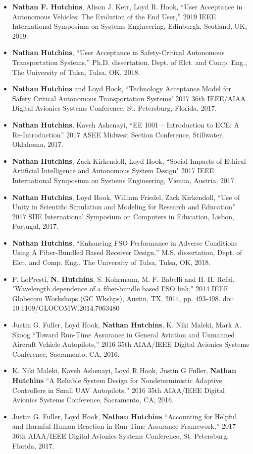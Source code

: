 \documentclass[line]{res} %
\begin{document}
\begin{resume}
\vspace{15pt} %
\begin{itemize} \itemsep -2pt %
\item \textbf{Nathan F. Hutchins}, Alison J. Kerr, Loyd R. Hook, ``User Acceptance in Autonomous Vehicles: The Evolution of the End User,'' 2019 IEEE International Symposium on Systems Engineering, Edinburgh, Scotland, UK, 2019.
\item \textbf{Nathan Hutchins}, ``User Acceptance in Safety-Critical Autonomous Transportation Systems,'' Ph.D. dissertation, Dept. of Elct. and Comp. Eng., The University of Tulsa, Tulsa, OK, 2018.
\item \textbf{Nathan Hutchins} and Loyd Hook, “Technology Acceptance Model for Safety Critical Autonomous Transportation Systems’ 2017 36th IEEE/AIAA Digital Avionics Systems
Conference, St. Petersburg, Florida, 2017.
\item \textbf{Nathan Hutchins}, Kaveh Ashenayi, “EE 1001 – Introduction to ECE: A Re-Introduction” 2017 ASEE Midwest Section Conference, Stillwater, Oklahoma, 2017.
\item \textbf{Nathan Hutchins}, Zack Kirkendoll, Loyd Hook, “Social Impacts of Ethical Artificial Intelligence and Autonomous System Design" 2017 IEEE International Symposium on Systems Engineering, Vienna, Austria, 2017.
\item \textbf{Nathan Hutchins}, Loyd Hook, William Friedel, Zack Kirkendoll, “Use of Unity in Scientific Simulation and Modeling for Research and Education” 2017 SIIE International Symposium on Computers in Education, Lisbon, Portugal, 2017.
\item \textbf{Nathan Hutchins}, ``Enhancing FSO Performance in Adverse Conditions Using A Fiber-Bundled Based Receiver Design,'' M.S. dissertation, Dept. of Elct. and Comp. Eng., The University of Tulsa, Tulsa, OK, 2018.
\item P. LoPresti,\textbf{ N. Hutchins}, S. Kohrmann, M. F. Babelli and H. H. Refai, "Wavelength dependence of a fiber-bundle based FSO link," 2014 IEEE Globecom Workshops (GC Wkshps), Austin, TX, 2014, pp. 493-498. doi: 10.1109/GLOCOMW.2014.7063480
\item Justin G. Fuller, Loyd Hook, \textbf{Nathan Hutchins}, K. Niki Maleki, Mark A. Skoog “Toward Run-Time Assurance in General Aviation and Unmanned Aircraft Vehicle Autopilots,” 2016 35th AIAA/IEEE Digital Avionics Systems Conference, Sacramento, CA, 2016.
\item K. Niki Maleki, Kaveh Ashenayi, Loyd R Hook, Justin G Fuller, \textbf{Nathan Hutchins} “A Reliable System Design for Nondeterministic Adaptive Controllers in Small UAV Autopilots,” 2016 35th AIAA/IEEE Digital Avionics Systems Conference, Sacramento, CA, 2016.
\item Justin G. Fuller, Loyd Hook, \textbf{Nathan Hutchins} “Accounting for Helpful and Harmful Human Reaction in Run-Time Assurance Framework,” 2017 36th AIAA/IEEE Digital Avionics Systems Conference, St. Petersburg, Florida, 2017.
\end{itemize}


\end{resume}
\end{document}
